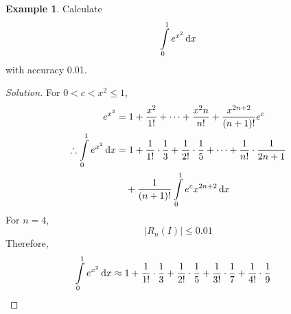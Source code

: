 \documentclass[fleqn, a4paper, 12pt]{article}
\theoremstyle{definition}
\newtheorem{example}{Example}
\theoremstyle{theorem}
\theoremstyle{remark}
\newenvironment{solution}
{\begin{proof}[Solution]\let\qed\relax}
	{\end{proof}}
\begin{document}
\begin{example}
	Calculate \[\int\limits_{0}^{1} e^{x^2} \dif x\] with accuracy 0.01.
\end{example}

\begin{solution}
	For $0 < c < x^2 \leq 1$,
	\begin{align*}
		e^{x^2} &= 1 + \dfrac{x^2}{1!} + \dots + \dfrac{x^2n}{n!} + \dfrac{x^{2n + 2}}{(n + 1)!} e^c\\
		\therefore \int\limits_{0}^{1} e^{x^2} \dif x &= 1 + \dfrac{1}{1!} \cdot \dfrac{1}{3} + \dfrac{1}{2!} \cdot \dfrac{1}{5} + \dots + \dfrac{1}{n!} \cdot \dfrac{1}{2n + 1} \\
		&\quad + \dfrac{1}{(n + 1)!} \int\limits_{0}^{1} e^c x^{2n + 2} \dif x
	\end{align*}
	For $n = 4$,
	\begin{equation*}
		|R_n(I)| \leq 0.01
	\end{equation*}
	Therefore,
	\begin{align*}
		\int\limits_{0}^{1} e^{x^2} \dif x &\approx 1 + \dfrac{1}{1!} \cdot \dfrac{1}{3} + \dfrac{1}{2!} \cdot \dfrac{1}{5} + \dfrac{1}{3!} \cdot \dfrac{1}{7} + \dfrac{1}{4!} \cdot \dfrac{1}{9}
	\end{align*}
\end{solution}
\end{document}
